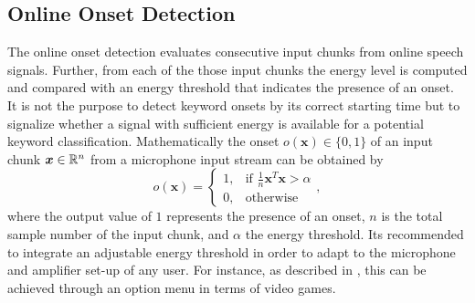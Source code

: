 
\subsection{Online Onset Detection}\label{sec:signal_onset_online}
The online onset detection evaluates consecutive input chunks from online speech signals.
Further, from each of the those input chunks the energy level is computed and compared with an energy threshold that indicates the presence of an onset.
It is not the purpose to detect keyword onsets by its correct starting time but to signalize whether a signal with sufficient energy is available for a potential keyword classification.
Mathematically the onset $o(\bm{x}) \in \{0, 1\}$ of an input chunk $\bm{x} \in \mathbb{R}^n$ from a microphone input stream can be obtained by
\begin{equation}
  o(\bm{x}) = 
  \begin{cases}
    1, & \text{if } \frac{1}{n} \bm{x}^T \bm{x} > \alpha\\
    0, & \text{otherwise} 
  \end{cases},
\end{equation}
where the output value of $1$ represents the presence of an onset, $n$ is the total sample number of the input chunk, and $\alpha$ the energy threshold.
Its recommended to integrate an adjustable energy threshold in order to adapt to the microphone and amplifier set-up of any user.
For instance, as described in , this can be achieved through an option menu in terms of video games.